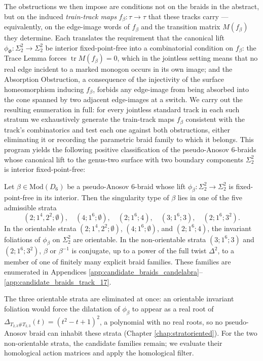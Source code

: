The obstructions we then impose are conditions not on the braids in the abstract, but on the induced \emph{train-track maps} $f_\beta \colon \tau \to \tau$ that these tracks carry --- equivalently, on the edge-image words of $f_\beta$ and the transition matrix $M(f_\beta)$ they determine. Each translates the requirement that the canonical lift $\phi_\Phi \colon \Sigma_2^2 \to \Sigma_2^2$ be interior fixed-point-free into a combinatorial condition on $f_\beta$: the Trace Lemma forces $\operatorname{tr} M(f_\beta) = 0$, which in the jointless setting means that no real edge incident to a marked monogon occurs in its own image; and the Absorption Obstruction, a consequence of the injectivity of the surface homeomorphism inducing $f_\beta$, forbids any edge-image from being absorbed into the cone spanned by two adjacent edge-images at a switch. We carry out the resulting enumeration in full: for every jointless standard track in each such stratum we exhaustively generate the train-track maps $f_\beta$ consistent with the track's combinatorics and test each one against both obstructions, either eliminating it or recording the parametric braid family to which it belongs. This program yields the following positive classification of the pseudo-Anosov 6-braids whose canonical lift to the genus-two surface with two boundary components $\Sigma_2^2$ is interior fixed-point-free:

\begin{theorem}\label{thm:fpf_classification}
Let $\beta \in \mathrm{Mod}(D_6)$ be a pseudo-Anosov 6-braid whose lift $\phi_\beta \colon \Sigma_2^2 \to \Sigma_2^2$ is fixed-point-free in its interior. Then the singularity type of $\beta$ lies in one of the five admissible strata
\[
(2; 1^4, 2^2; \emptyset),\quad (4; 1^6; \emptyset),\quad (2; 1^6; 4),\quad (3; 1^6; 3),\quad (2; 1^6; 3^2).
\]
In the orientable strata $(2; 1^4, 2^2; \emptyset)$, $(4; 1^6; \emptyset)$, and $(2; 1^6; 4)$, the invariant foliations of $\phi_\beta$ on $\Sigma_2^2$ are orientable. In the non-orientable strata $(3; 1^6; 3)$ and $(2; 1^6; 3^2)$, $\beta$ or $\beta^{-1}$ is conjugate, up to a power of the full twist $\Delta^2$, to a member of one of finitely many explicit braid families. These families are enumerated in Appendices \ref{app:candidate_braids_candelabra}--\ref{app:candidate_braids_track_17}.
\end{theorem}

The three orientable strata are eliminated at once: an orientable invariant foliation would force the dilatation of $\phi_\beta$ to appear as a real root of $\Delta_{T_{2,3} \# T_{2,3}}(t) = (t^2-t+1)^2$, a polynomial with no real roots, so no pseudo-Anosov braid can inhabit these strata (Chapter \ref{chap:stratoriented}). For the two non-orientable strata, the candidate families remain; we evaluate their homological action matrices and apply the homological filter.

